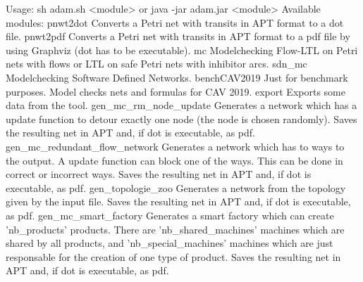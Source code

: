 Usage: sh adam.sh <module> or java -jar adam.jar <module>
Available modules:
  pnwt2dot                       Converts a Petri net with transits in APT format to a dot
                                 file.
  pnwt2pdf                       Converts a Petri net with transits in APT format to a pdf
                                 file by using Graphviz (dot has to be executable).
  mc                             Modelchecking Flow-LTL on Petri nets with flows or LTL on
                                 safe Petri nets with inhibitor arcs.
  sdn_mc                         Modelchecking Software Defined Networks.
  benchCAV2019                   Just for benchmark purposes. Model checks nets and formulas
                                 for CAV 2019.
  export                         Exports some data from the tool.
  gen_mc_rm_node_update          Generates a network which has a update function to detour
                                 exactly one node (the node is chosen randomly). Saves the
                                 resulting net in APT and, if dot is executable, as pdf.
  gen_mc_redundant_flow_network  Generates a network which has to ways to the output. A update
                                 function can block one of the ways. This can be done in
                                 correct or incorrect ways. Saves the resulting net in APT
                                 and, if dot is executable, as pdf.
  gen_topologie_zoo              Generates a network from the topology given by the input
                                 file. Saves the resulting net in APT and, if dot is
                                 executable, as pdf.
  gen_mc_smart_factory           Generates a smart factory which can create 'nb_products'
                                 products. There
                                 are 'nb_shared_machines' machines which are shared by all
                                 products, and
                                 'nb_special_machines' machines which are just responsable for
                                 the
                                 creation of one type of product. Saves the resulting net in
                                 APT and, if dot is executable, as pdf.
